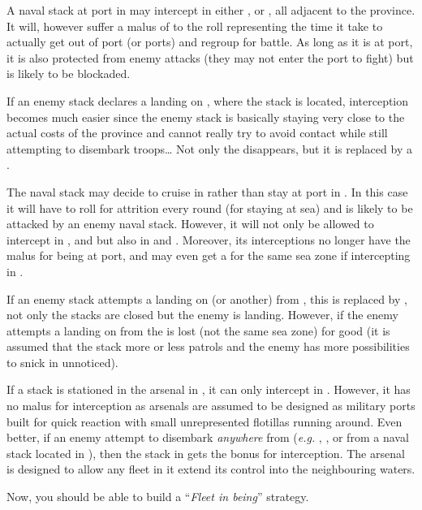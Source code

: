\begin{exemple}
  A naval stack at port in \provinceCornwall may intercept in either
  \seazoneIrlande, \seazoneCeltique or \seazoneManche, all adjacent to the
  province. It will, however suffer a malus of  to the roll
  representing the time it take to actually get out of port (or ports) and
  regroup for battle. As long as it is at port, it is also protected from
  enemy attacks (they may not enter the port to fight) but is likely to be
  blockaded.

  If an enemy stack declares a landing on \provinceCornwall, where the stack
  is located, interception becomes much easier since the enemy stack is
  basically staying very close to the actual costs of the province and cannot
  really try to avoid contact while still attempting to disembark troops\ldots
  Not only the  disappears, but it is replaced by a .

  \smallskip

  The naval stack may decide to cruise in \seazoneCeltique rather than stay at
  port in \provinceCornwall. In this case it will have to roll for attrition
  every round (for staying at sea) and is likely to be attacked by an enemy
  naval stack. However, it will not only be allowed to intercept in
  \seazoneIrlande, \seazoneCeltique and \seazoneManche but also in
  \seazoneGascogne and \seazoneRockall. Moreover, its interceptions no longer
  have the  malus for being at port, and may even get a 
  for the same sea zone if intercepting in \seazoneCeltique.

  If an enemy stack attempts a landing on \provinceCornwall (or another) from
  \seazoneCeltique, this  is replaced by , not only the
  stacks are closed but the enemy is landing. However, if the enemy attempts a
  landing on \provinceCornwall from \seazoneManche the  is lost (not
  the same sea zone) for good (it is assumed that the stack more or less
  patrols and the enemy has more possibilities to snick in unnoticed).

  \smallskip

  If a stack is stationed in the \villePortsmouth arsenal in
  , it can only intercept in \seazoneManche. However, it has
  no malus for interception as arsenals are assumed to be designed as military
  ports built for quick reaction with small unrepresented flotillas running
  around. Even better, if an enemy attempt to disembark \emph{anywhere} from
  \seazoneManche (\emph{e.g.} \provinceWessex, \provinceNormandie,
  \provincePicardie or \provinceKent from a naval stack located in
  \seazoneManche), then the stack in \villePortsmouth gets the 
  bonus for interception. The arsenal is designed to allow any fleet in it
  extend its control into the neighbouring waters.

  \smallskip

  Now, you should be able to build a ``\emph{Fleet in being}'' strategy.
\end{exemple}

